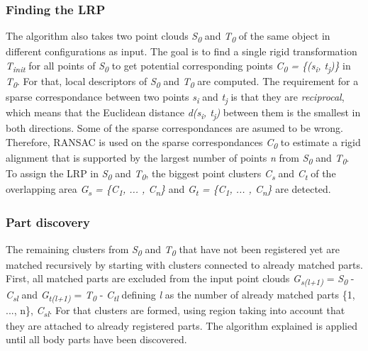\documentclass[a4paper,english,11pt]{report}
\begin{document}
\subsubsection{Finding the LRP}

The algorithm also takes two point clouds \textit{S\textsubscript{0}} and \textit{T\textsubscript{0}} of the same object in different configurations as input.
The goal is to find a single rigid transformation \textit{T\textsubscript{init}} for all points of \textit{S\textsubscript{0}} to get potential corresponding points \textit{C\textsubscript{0} = \{(s\textsubscript{i}, t\textsubscript{j})\}} in \textit{T\textsubscript{0}}. For that, local descriptors of \textit{S\textsubscript{0}} and \textit{T\textsubscript{0}} are computed. The requirement for a sparse correspondance between two points \textit{s\textsubscript{i}} and \textit{t\textsubscript{j}}  is that they are \textit{reciprocal}, which means that the Euclidean distance \textit{d(s\textsubscript{i}, t\textsubscript{j})} between them is the smallest in both directions. Some of the sparse correspondances are asumed to be wrong. Therefore, RANSAC is used on the sparse correspondances \textit{C\textsubscript{0}} to estimate a rigid alignment that is supported by the largest number of points \textit{n} from \textit{S\textsubscript{0}} and \textit{T\textsubscript{0}}. To assign the LRP in \textit{S\textsubscript{0}} and \textit{T\textsubscript{0}}, the biggest point clusters \textit{C\textsubscript{s}} and \textit{C\textsubscript{t}} of the overlapping area \textit{G\textsubscript{s} = \{C\textsubscript{1}, ... , C\textsubscript{n}\} } and \textit{G\textsubscript{t} = \{C\textsubscript{1}, ... , C\textsubscript{n}\} } are detected. 


\subsubsection{Part discovery}

The remaining clusters from \textit{S\textsubscript{0}} and \textit{T\textsubscript{0}} that have not been registered yet are matched recursively by starting with clusters connected to already matched parts. First, all matched parts are excluded from the input point clouds  \textit{G\textsubscript{s(l+1)}} = \textit{S\textsubscript{0}} - \textit{C\textsubscript{sl}} and \textit{G\textsubscript{t(l+1)}} = \textit{T\textsubscript{0}} - \textit{C\textsubscript{tl}} defining \textit{l} as the number of already matched parts \{1, ..., n\}, \textit{C\textsubscript{sl}}. For that clusters are formed, using region taking into account that they are attached to already registered parts. The algorithm explained is applied until all body parts have been discovered.
\end{document}
